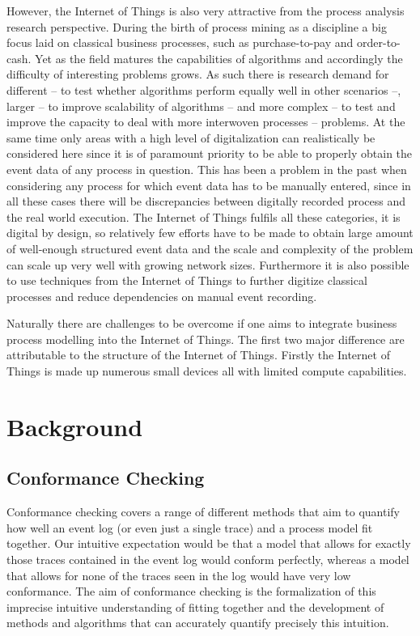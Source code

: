 \documentclass[runningheads]{template/llncs}
\begin{document}
However, the Internet of Things is also very attractive from the process analysis research perspective.
During the birth of process mining as a discipline a big focus laid on classical business processes, such as purchase-to-pay and order-to-cash.
Yet as the field matures the capabilities of algorithms and accordingly the difficulty of interesting problems grows.
As such there is research demand \cite{JKM*20} for different -- to test whether algorithms perform equally well in other scenarios --, larger -- to improve scalability of algorithms -- and more complex -- to test and improve the capacity to deal with more interwoven processes -- problems.
At the same time only areas with a high level of digitalization can realistically be considered here since it is of paramount priority to be able to properly obtain the event data of any process in question.
This has been a problem in the past when considering any process for which event data has to be manually entered, since in all these cases there will be discrepancies between digitally recorded process and the real world execution.
The Internet of Things fulfils all these categories, it is digital by design, so relatively few efforts have to be made to obtain large amount of well-enough structured event data and the scale and complexity of the problem can scale up very well with growing network sizes. 
Furthermore it is also possible to use techniques from the Internet of Things to further digitize classical processes and reduce dependencies on manual event recording.

Naturally there are challenges to be overcome if one aims to integrate business process modelling into the Internet of Things.
The first two major difference are attributable to the structure of the Internet of Things.
Firstly the Internet of Things is made up numerous small devices all with limited compute capabilities.

\section{Background}
\subsection{Conformance Checking}
Conformance checking covers a range of different methods that aim to quantify how well an event log (or even just a single trace) and a process model fit together.
Our intuitive expectation would be that a model that allows for exactly those traces contained in the event log would conform perfectly, whereas a model that allows for none of the traces seen in the log would have very low conformance.
The aim of conformance checking is the formalization of this imprecise intuitive understanding of fitting together and the development of methods and algorithms that can accurately quantify precisely this intuition.
\end{document}
